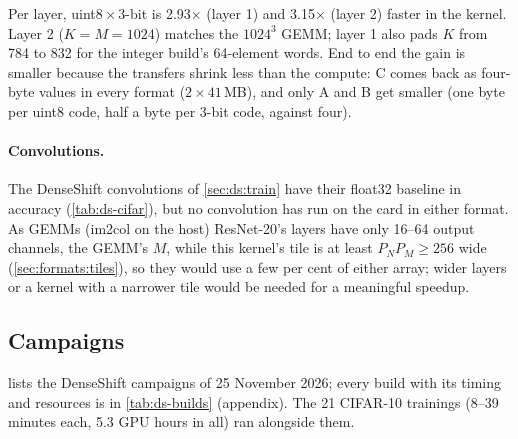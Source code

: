 Per layer, uint8\,\(\times\)\,3-bit is 2.93\(\times\) (layer 1) and 3.15\(\times\) (layer 2) faster in the kernel.
Layer 2 (\(K = M = 1024\)) matches the \(1024^3\) GEMM; layer 1 also pads \(K\) from 784 to 832 for the integer
build's 64-element words. End to end the gain is smaller because the transfers shrink less than the compute: C comes
back as four-byte values in every format (\(2\times41\)\,MB), and only A and B get smaller (one byte per uint8 code,
half a byte per 3-bit code, against four).

\paragraph{Convolutions.} The DenseShift convolutions of \cref{sec:ds:train} have their float32 baseline in
accuracy (\cref{tab:ds-cifar}), but no convolution has run on the card in either format. As GEMMs (im2col on the
host) ResNet-20's layers have only 16--64 output channels, the GEMM's \(M\), while this kernel's tile is at least
\(P_N P_M \ge 256\) wide (\cref{sec:formats:tiles}), so they would use a few per cent of either array; wider layers
or a kernel with a narrower tile would be needed for a meaningful speedup.

\subsection{Campaigns}
\label{sec:ds:campaigns}
 lists the DenseShift campaigns of 25 November 2026; every build with its timing and resources
is in \cref{tab:ds-builds} (appendix). The 21 CIFAR-10 trainings (8--39 minutes each, 5.3 GPU hours in all) ran
alongside them.

